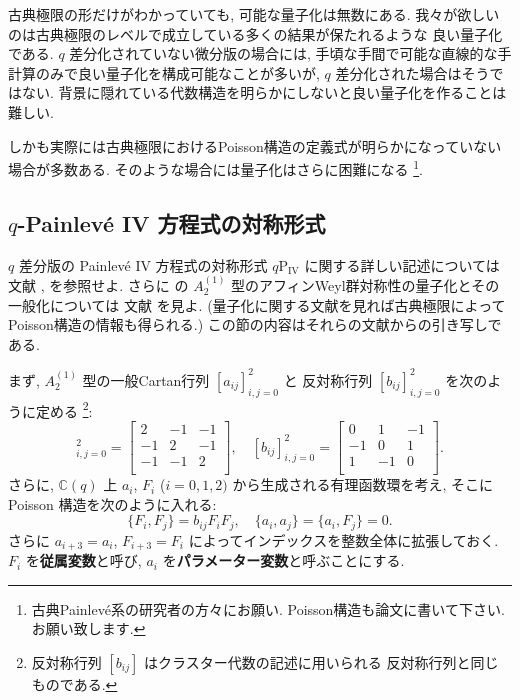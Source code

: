 \documentclass[12pt,twoside,dvipdfm]{msjproc}
\newcommand\C{{\mathbb C}} %
\theoremstyle{definition} %
\theoremstyle{definition} %
\theoremstyle{definition} %
\numberwithin{theorem}{section}
\numberwithin{equation}{section}
\numberwithin{figure}{section}
\numberwithin{table}{section}
\newcommand\qP[1]{{\text{$q\mathrm{P}_{\text{#1}}$}}}
\begin{document}
古典極限の形だけがわかっていても, 可能な量子化は無数にある.
我々が欲しいのは古典極限のレベルで成立している多くの結果が保たれるような
良い量子化である.
$q$ 差分化されていない微分版の場合には, 
手頃な手間で可能な直線的な手計算のみで良い量子化を構成可能なことが多いが, 
$q$ 差分化された場合はそうではない.
背景に隠れている代数構造を明らかにしないと良い量子化を作ることは難しい.

しかも実際には古典極限におけるPoisson構造の定義式が明らかになっていない場合が多数ある.
そのような場合には量子化はさらに困難になる%
\footnote{古典Painlev\'e系の研究者の方々にお願い. 
Poisson構造も論文に書いて下さい.  お願い致します.}.




\subsection{$q$-Painlev\'e IV 方程式の対称形式 \qP{IV}}

$q$ 差分版の Painlev\'e IV 方程式の対称形式 $\qP{IV}$ に関する詳しい記述については
文献 \cite{KNY-qPIV}, \cite{Noumi-AWG} を参照せよ.
さらに \qP{IV} の $A^{(1)}_2$ 型のアフィンWeyl群対称性の量子化とその一般化については
文献  \cite{Hasegawa-QB} を見よ. 
(量子化に関する文献を見れば古典極限によってPoisson構造の情報も得られる.)
この節の内容はそれらの文献からの引き写しである. 

まず, $A^{(1)}_2$ 型の一般Cartan行列 $[a_{ij}]_{i,j=0}^2$ と
反対称行列 $[b_{ij}]_{i,j=0}^2$ を次のように定める%
\footnote{反対称行列 $[b_{ij}]$ はクラスター代数の記述に用いられる
反対称行列と同じものである.}:
\begin{equation*}
  [a_{ij}]_{i,j=0}^2 = 
  \begin{bmatrix}
     2 & -1 & -1 \\
   -1 &  2 & -1 \\
   -1 & -1 & 2 \\
  \end{bmatrix},
  \quad
  [b_{ij}]_{i,j=0}^2 =
  \begin{bmatrix}
      0 & 1 & -1 \\
    -1 & 0 & 1   \\
     1 & -1 & 0 \\
  \end{bmatrix}.
\end{equation*}
さらに, $\C(q)$ 上 $a_i$, $F_i$ ($i=0,1,2)$ から生成される有理函数環を考え, 
そこに Poisson 構造を次のように入れる:
\begin{equation*}
 \{F_i, F_j\} = b_{ij} F_i F_j, \quad \{a_i,a_j\}=\{a_i,F_j\}=0.
\end{equation*}
さらに $a_{i+3}=a_i$, $F_{i+3}=F_i$ によってインデックスを整数全体に拡張しておく.
$F_i$ を{\bf 従属変数}と呼び, $a_i$ を{\bf パラメーター変数}と呼ぶことにする.
\end{document}
